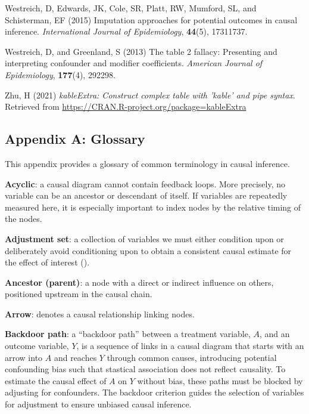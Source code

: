\documentclass[
  singlecolumn]{article}
\newlength{\cslhangindent}
\newenvironment{CSLReferences}[2] %
 {\begin{list}{}{%
  \setlength{\itemindent}{0pt}
  \setlength{\leftmargin}{0pt}
  \setlength{\parsep}{0pt}
  \ifodd #1
   \setlength{\leftmargin}{\cslhangindent}
   \setlength{\itemindent}{-1\cslhangindent}
  \fi
  \setlength{\itemsep}{#2\baselineskip}}}
 {\end{list}}
\begin{document}
\begin{CSLReferences}{1}{0}
Westreich, D, Edwards, JK, Cole, SR, Platt, RW, Mumford, SL, and
Schisterman, EF (2015) Imputation approaches for potential outcomes in
causal inference. \emph{International Journal of Epidemiology},
\textbf{44}(5), 17311737.

Westreich, D, and Greenland, S (2013) The table 2 fallacy: Presenting
and interpreting confounder and modifier coefficients. \emph{American
Journal of Epidemiology}, \textbf{177}(4), 292298.

Zhu, H (2021) \emph{kableExtra: Construct complex table with 'kable' and
pipe syntax}. Retrieved from
\url{https://CRAN.R-project.org/package=kableExtra}

\end{CSLReferences}

\newpage{}

\subsection{Appendix A: Glossary}\label{appendix-a}

This appendix provides a glossary of common terminology in causal
inference.

\textbf{Acyclic}: a causal diagram cannot contain feedback loops. More
precisely, no variable can be an ancestor or descendant of itself. If
variables are repeatedly measured here, it is especially important to
index nodes by the relative timing of the nodes.

\textbf{Adjustment set}: a collection of variables we must either
condition upon or deliberately avoid conditioning upon to obtain a
consistent causal estimate for the effect of interest
().

\textbf{Ancestor (parent)}: a node with a direct or indirect influence
on others, positioned upstream in the causal chain.

\textbf{Arrow}: denotes a causal relationship linking nodes.

\textbf{Backdoor path}: a ``backdoor path'' between a treatment
variable, \(A\), and an outcome variable, \(Y\), is a sequence of links
in a causal diagram that starts with an arrow into \(A\) and reaches
\(Y\) through common causes, introducing potential confounding bias such
that stastical association does not reflect causality. To estimate the
causal effect of \(A\) on \(Y\) without bias, these paths must be
blocked by adjusting for confounders. The backdoor criterion guides the
selection of variables for adjustment to ensure unbiased causal
inference.
\end{document}
